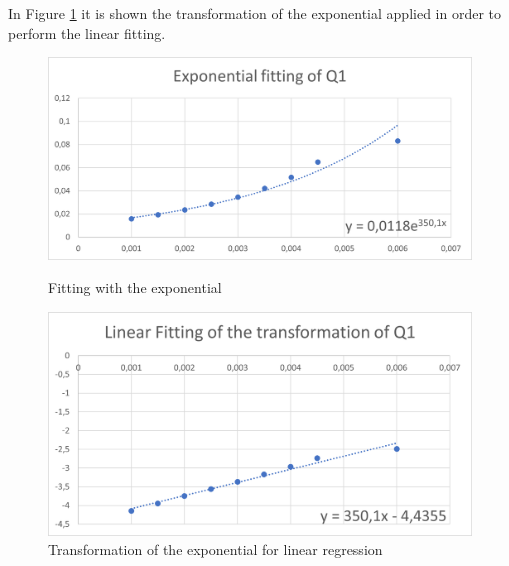 \documentclass{article}
\begin{document}
                    In Figure \ref{fig:Q05_lin_delta} it is shown the transformation of the exponential applied in order to perform the linear fitting.             
                    \begin{figure}[htbp!]
                        \centering
                        \begin{minipage}[c]{.40\textwidth}
                            \centering
                            \includegraphics[width=\textwidth]{./data_analysis/Q05_exp_delta.png}
                            \caption{Fitting with the exponential}
                            \label{fig:Q05_exp_delta}
                        \end{minipage}
                        \hspace{10mm}
                        \begin{minipage}[c]{.40\textwidth}
                            \centering
                            \includegraphics[width=\textwidth]{./data_analysis/Q05_lin_delta.png}
                            \caption{Transformation of the exponential for linear regression}
                            \label{fig:Q05_lin_delta}
                        \end{minipage}
                    \end{figure}
                    
\end{document}
